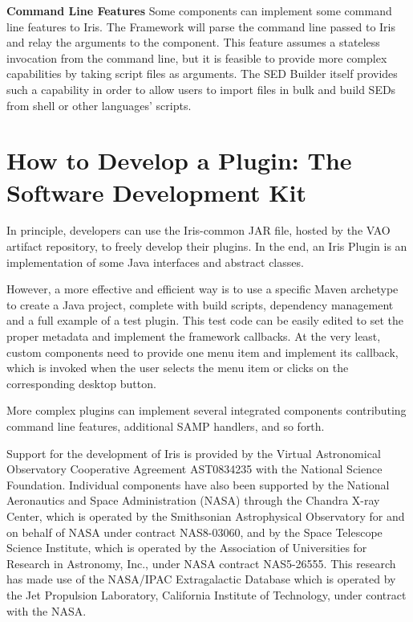 \textbf{Command Line Features}
Some components can implement some command line features to Iris. The Framework will parse the command line passed to Iris and relay the arguments to the component. This feature assumes a stateless invocation from the command line, but it is feasible to provide more complex capabilities by taking script files as arguments. The SED Builder itself provides such a capability in order to allow users to import files in bulk and build SEDs from shell or other languages' scripts.

\section{How to Develop a Plugin: The Software Development Kit}
In principle, developers can use the Iris-common JAR file, hosted by the VAO artifact repository, to freely develop their plugins. In the end, an Iris Plugin is an implementation of some Java interfaces and abstract classes.

However, a more effective and efficient way is to use a specific Maven archetype to create a Java project, complete with build scripts, dependency management and a full example of a test plugin. This test code can be easily edited to set the proper metadata and implement the framework callbacks. At the very least, custom components need to provide one menu item and implement its callback, which is invoked when the user selects the menu item or clicks on the corresponding desktop button.

More complex plugins can implement several integrated components contributing command line features, additional SAMP handlers, and so forth.

\acknowledgements
Support for the development of Iris is provided by the Virtual Astronomical Observatory Cooperative Agreement AST0834235 with the National Science Foundation. Individual components have also been supported by the National Aeronautics and Space Administration (NASA) through the Chandra X-ray Center, which is operated by the Smithsonian Astrophysical Observatory for and on behalf of NASA under contract NAS8-03060,  and by the Space Telescope Science Institute, which is operated by the Association of Universities for Research in Astronomy, Inc., under NASA contract NAS5-26555. This research has made use of the NASA/IPAC Extragalactic Database which is operated by the Jet Propulsion Laboratory, California Institute of Technology, under contract with the NASA.




